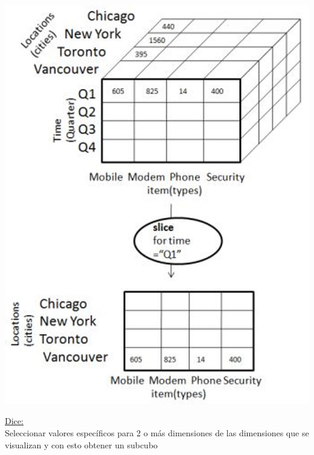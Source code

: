 \documentclass{fancyslides}
\begin{document}
\begin{frame}
\misc
{
  \begin{center}
  \includegraphics[scale=0.15]{slice}
  \end{center}
}
\end{frame}


\begin{frame}
\misc
{
  \underline{Dice:}\\
  Seleccionar valores específicos para 2 o más dimensiones de las dimensiones que se visualizan
  y con esto obtener un subcubo 
}
\end{frame}
\end{document}
